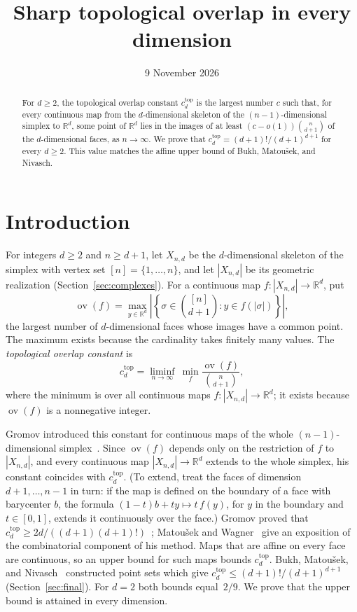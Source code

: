 \documentclass[11pt]{article}
\title{Sharp topological overlap in every dimension}
\author{}
\date{9 November 2026}
\theoremstyle{definition}
\numberwithin{equation}{section}
\newcommand{\R}{\mathbb R}
\DeclareMathOperator{\ov}{ov}
\begin{document}
\maketitle

\begin{abstract}
For $d\ge2$, the topological overlap constant $c_d^{\mathrm{top}}$ is the largest number $c$ such that, for every continuous map from the $d$-dimensional skeleton of the $(n-1)$-dimensional simplex to $\R^d$, some point of $\R^d$ lies in the images of at least $(c-o(1))\binom n{d+1}$ of the $d$-dimensional faces, as $n\to\infty$. We prove that $c_d^{\mathrm{top}}=(d+1)!/(d+1)^{d+1}$ for every $d\ge2$. This value matches the affine upper bound of Bukh, Matou\v{s}ek, and Nivasch.
\end{abstract}

\section{Introduction}\label{sec:intro}

For integers $d\ge2$ and $n\ge d+1$, let $X_{n,d}$ be the $d$-dimensional skeleton of the simplex with vertex set $[n]=\{1,\ldots,n\}$, and let $|X_{n,d}|$ be its geometric realization (Section~\ref{sec:complexes}). For a continuous map $f:|X_{n,d}|\to\R^d$, put
\begin{equation*}
 \ov(f)=\max_{y\in\R^d}\left|\left\{\sigma\in\binom{[n]}{d+1}:y\in f(|\sigma|)\right\}\right|,
\end{equation*}
the largest number of $d$-dimensional faces whose images have a common point. The maximum exists because the cardinality takes finitely many values. The \emph{topological overlap constant} is
\begin{equation*}
 c_d^{\mathrm{top}}=\liminf_{n\to\infty}\ \min_f\frac{\ov(f)}{\binom n{d+1}},
\end{equation*}
where the minimum is over all continuous maps $f:|X_{n,d}|\to\R^d$; it exists because $\ov(f)$ is a nonnegative integer.

Gromov introduced this constant for continuous maps of the whole $(n-1)$-dimensional simplex~\cite[\S1.1]{Gromov}. Since $\ov(f)$ depends only on the restriction of $f$ to $|X_{n,d}|$, and every continuous map $|X_{n,d}|\to\R^d$ extends to the whole simplex, his constant coincides with $c_d^{\mathrm{top}}$. (To extend, treat the faces of dimension $d+1,\ldots,n-1$ in turn: if the map is defined on the boundary of a face with barycenter $b$, the formula $(1-t)b+ty\mapsto t\,f(y)$, for $y$ in the boundary and $t\in[0,1]$, extends it continuously over the face.) Gromov proved that $c_d^{\mathrm{top}}\ge 2d/((d+1)(d+1)!)$~\cite[\S1.1, p.~419]{Gromov}; Matou\v{s}ek and Wagner~\cite{MW} give an exposition of the combinatorial component of his method. Maps that are affine on every face are continuous, so an upper bound for such maps bounds $c_d^{\mathrm{top}}$. Bukh, Matou\v{s}ek, and Nivasch~\cite[Theorem~1.3]{BMN} constructed point sets which give $c_d^{\mathrm{top}}\le(d+1)!/(d+1)^{d+1}$ (Section~\ref{sec:final}). For $d=2$ both bounds equal~$2/9$. We prove that the upper bound is attained in every dimension.
\end{document}
